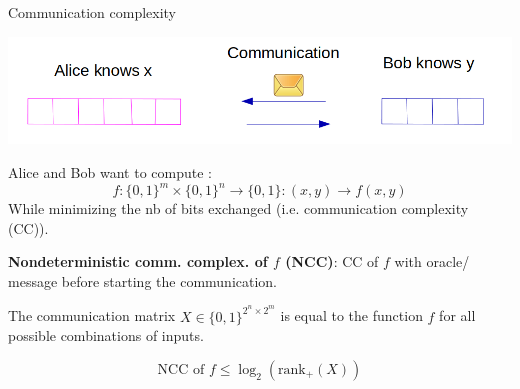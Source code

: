 \begin{frame}{Communication complexity}
\begin{center}
\includegraphics[scale=0.2]{Section4/communication.png}
\end{center}
\small
Alice and Bob want to compute :
\[f:\{0,1\}^m \times \{0,1\}^n \rightarrow \{0,1\} : (x,y) \rightarrow f(x,y)
\]
While minimizing the nb of bits exchanged (i.e. communication complexity (CC)).


\textbf{Nondeterministic comm. complex. of $f$ (NCC)}: CC of $f$ with oracle/ message before starting the communication.


The communication matrix $X \in \{0,1\}^{2^n\times 2^m}$ is equal to the function $f$ for all possible combinations of inputs.

\begin{thm}[Yannakis]
\[\text{NCC of } f \leq \log_2(\text{rank}_+(X))
\]
\end{thm}
\end{frame}